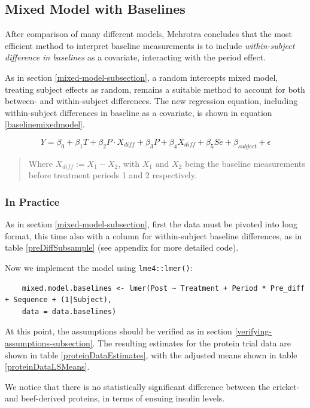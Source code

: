 \documentclass[12pt, TexShade, letterpaper]{report}
\begin{document}
\subsection{Mixed Model with Baselines}
After comparison of many different models, Mehrotra \cite{mehrotra2014} concludes that the most efficient method to interpret baseline measurements is to include \textit{within-subject difference in baselines} as a covariate, interacting with the period effect.

As in section \ref{mixed-model-subsection}, a random intercepts mixed model, treating subject effects as random, remains a suitable method to account for both between- and within-subject differences. The new regression equation, including within-subject differences in baseline as a covariate, is shown in equation \ref{baselinemixedmodel}.

\begin{equation}
    Y = \beta_0 + \beta_1 T + \beta_2 P \cdot X_{diff} + \beta_3 P +
    \beta_4 X_{diff} + \beta_5 Se + \beta_{subject} + \epsilon
    \label{baselinemixedmodel}
\end{equation}
\begin{quote}
    Where $X_{diff} := X_1 - X_2$, with $X_1$ and $X_2$ being the baseline measurements before treatment periods 1 and 2 respectively.
\end{quote}

\subsubsection{In Practice}
As in section \ref{mixed-model-subsection}, first the data must be pivoted into long format, this time also with a column for within-subject baseline differences, as in table \ref{preDiffSubsample} (see appendix for more detailed code).


Now we implement the model using \texttt{lme4::lmer()}:
\begin{verbatim}
    mixed.model.baselines <- lmer(Post ~ Treatment + Period * Pre_diff + Sequence + (1|Subject),
    data = data.baselines)
\end{verbatim}
At this point, the assumptions should be verified as in section \ref{verifying-assumptions-subsection}. The resulting estimates for the protein trial data are shown in table \ref{proteinDataEstimates}, with the adjusted means shown in table \ref{proteinDataLSMeans}.


We notice that there is no statistically significant difference between the cricket- and beef-derived proteins, in terms of ensuing insulin levels.

	{
	
	
	
	
	}
	
\end{document}
